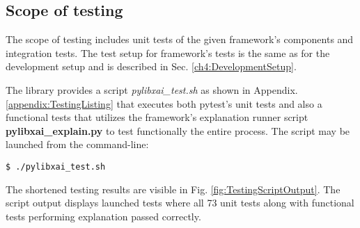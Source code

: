 \documentclass[
    bindingoffset=5mm,  %
    footnoteindent=3mm, %
    hyphenation=true    %
]{src/wut-thesis}
\begin{document}
\subsection{Scope of testing}

The scope of testing includes unit tests of the given framework's components and integration tests.
The test setup for framework's tests is the same as for the development setup and is described
in Sec. \ref{ch4:DevelopmentSetup}.

The library provides a script \emph{pylibxai\_test.sh} as shown in Appendix. \ref{appendix:TestingListing} that
executes both pytest's unit tests and also a functional tests
that utilizes the framework's explanation runner script \textbf{pylibxai\_explain.py} to
test functionally the entire process. The script may be launched from the command-line:
\begin{verbatim}
$ ./pylibxai_test.sh
\end{verbatim}

The shortened testing results are visible in Fig. \ref{fig:TestingScriptOutput}.
The script output displays launched tests where all 73 unit tests along with functional
tests performing explanation passed correctly.
\end{document}
